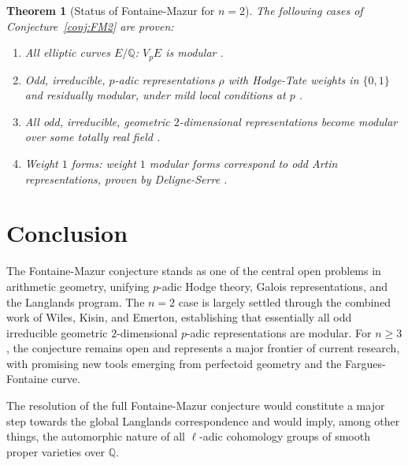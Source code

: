 \documentclass[12pt,a4paper]{amsart}
\newtheorem{theorem}{Theorem}[section]
\theoremstyle{definition}
\theoremstyle{remark}
\newcommand{\Q}{\mathbb{Q}}
\begin{document}
\begin{theorem}[Status of Fontaine-Mazur for $n=2$]
  The following cases of Conjecture~\ref{conj:FM2} are proven:
  \begin{enumerate}[label=(\roman*)]
    \item All elliptic curves $E/\Q$: $V_pE$ is modular \cite{BCDT2001}.
    \item Odd, irreducible, $p$-adic representations $\rho$ with Hodge-Tate weights
      in $\{0,1\}$ and residually modular, under mild local conditions at $p$
      \cite{Kisin2009, Emerton2010}.
    \item All odd, irreducible, geometric $2$-dimensional representations become modular
      over some totally real field \cite{Taylor2002}.
    \item Weight $1$ forms: weight $1$ modular forms correspond to odd Artin
      representations, proven by Deligne-Serre \cite{DS1974}.
  \end{enumerate}
\end{theorem}

\section{Conclusion}\label{sec:conclusion}

The Fontaine-Mazur conjecture stands as one of the central open problems in arithmetic
geometry, unifying $p$-adic Hodge theory, Galois representations, and the Langlands
program. The $n=2$ case is largely settled through the combined work of Wiles, Kisin, and
Emerton, establishing that essentially all odd irreducible geometric $2$-dimensional
$p$-adic representations are modular. For $n \geq 3$, the conjecture remains open and
represents a major frontier of current research, with promising new tools emerging from
perfectoid geometry and the Fargues-Fontaine curve.

The resolution of the full Fontaine-Mazur conjecture would constitute a major step
towards the global Langlands correspondence and would imply, among other things, the
automorphic nature of all $\ell$-adic cohomology groups of smooth proper varieties over $\Q$.
\end{document}
